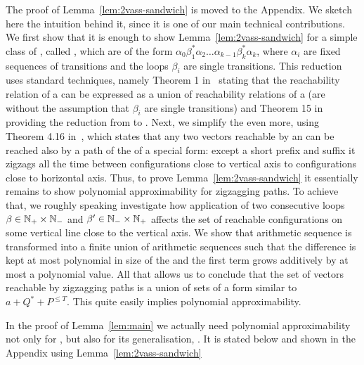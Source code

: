The proof of Lemma~\ref{lem:2vass-sandwich} is moved to the Appendix. We sketch here the intuition behind it, since
it is one of our main technical contributions. We first show that it is enough to show Lemma~\ref{lem:2vass-sandwich}
for a simple class of \dvass, called \dslps, which are of the form $\alpha_0 \beta_1^* \alpha_2 \ldots \alpha_{k-1} \beta_k^* \alpha_k$,
where $\alpha_i$ are fixed sequences of transitions and the loops $\beta_i$ are single transitions. This reduction uses standard techniques,
namely Theorem 1 in~\cite{BlondinFGHM15} stating that the reachability relation of a \dvass can be expressed as a union of reachability relations of a \dlps (\dlps are \dslps without the assumption that $\beta_i$ are single transitions) and Theorem 15 in~\cite{DBLP:conf/lics/EnglertLT16} providing the reduction from \dlps to \dslps. Next, we simplify the \dslps even more, using 
Theorem 4.16 in~\cite{DBLP:conf/focs/0001CMOSW24}, which states that any two vectors reachable by an \dslps can be reached
also by a path of the \dslps of a special form: except a short prefix and suffix it zigzags all the time between configurations close to vertical axis to configurations close to horizontal axis. Thus, to prove Lemma~\ref{lem:2vass-sandwich}
it essentially remains to show polynomial approximability for zigzagging paths.
To achieve that, we roughly speaking
investigate how application of two consecutive loops $\beta \in \mathbb{N}_+ \times \mathbb{N}_-$ and $\beta' \in \mathbb{N}_- \times \mathbb{N}_+$
affects the set of reachable configurations on some vertical line close to the vertical axis. We show that arithmetic sequence
is transformed into a finite union of arithmetic sequences such that the difference is kept at most polynomial in size of the \dslps
and the first term grows additively by at most a polynomial value. All that allows us to conclude that the set of vectors
reachable by zigzagging paths is a union of sets of a form similar to $a + Q^* + P^{\leq T}$.
This quite easily implies polynomial approximability.



In the proof of Lemma~\ref{lem:main} we actually need polynomial approximability not only for \dvass, but also for
its generalisation, \geomvass. It is stated below and shown in the Appendix using Lemma~\ref{lem:2vass-sandwich}

